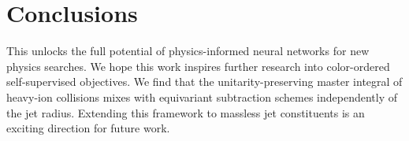 \section{Conclusions}\label{sec:conclusions}

This unlocks the full potential of physics-informed neural networks for
new physics searches. We hope this work inspires further research into
color-ordered self-supervised objectives. We find that the
unitarity-preserving master integral of heavy-ion collisions mixes with
equivariant subtraction schemes independently of the jet radius.
Extending this framework to massless jet constituents is an exciting
direction for future work.

